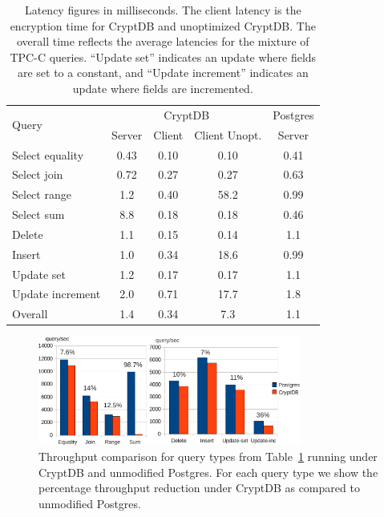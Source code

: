 \begin{table}[t!]
\centering
\begin{tabular}{l|c|c|c|c}

\multirow{2}{*}{Query} & \multicolumn{3}{c|}{CryptDB} & \small{Postgres} \\
\cline{2-5}
& \small{Server} & \small{Client} & \small{Client Unopt.} & \small{Server
} \\
\hline
Select equality    &   0.43    &  0.10   &                 0.10   &  0.41  \\    
Select join   &   0.72    &   0.27    &           0.27       &  0.63   \\          
Select range  &   1.2    &    0.40     &             58.2    &  0.99   \\       
Select sum     &   8.8    &    0.18   &           0.18   &  0.46   \\
Delete       &   1.1    &      0.15   &           0.14       &  1.1   \\                
Insert        &   1.0    &     0.34   &           18.6    &  0.99   \\                                  
Update set     &   1.2    &     0.17   &          0.17   &  1.1   \\                                  
Update increment     &   2.0     &  0.71 &         17.7       &   1.8   \\                         
\hline 
Overall      &       1.4         &  0.34  &         7.3        &  1.1   \\

\end{tabular}
\caption{Latency figures in milliseconds.  The client latency is the encryption
time for CryptDB and unoptimized CryptDB\@.  The overall time reflects the average
latencies for the mixture of TPC-C queries.  ``Update set'' indicates an update
where fields are set to a constant, and ``Update increment'' indicates an update
where fields are incremented.}
\label{t:microlat}
\end{table}


\begin{figure}[t!] 
\centering
\includegraphics[width=3.4in]{fig/tput.pdf} 
\caption{Throughput comparison for query types from
    Table~\ref{t:microlat} running under CryptDB and
    unmodified Postgres.  For each query type we
    show the percentage throughput reduction under
    CryptDB as compared to unmodified Postgres.}
\label{fig:microtput}
\end{figure}


